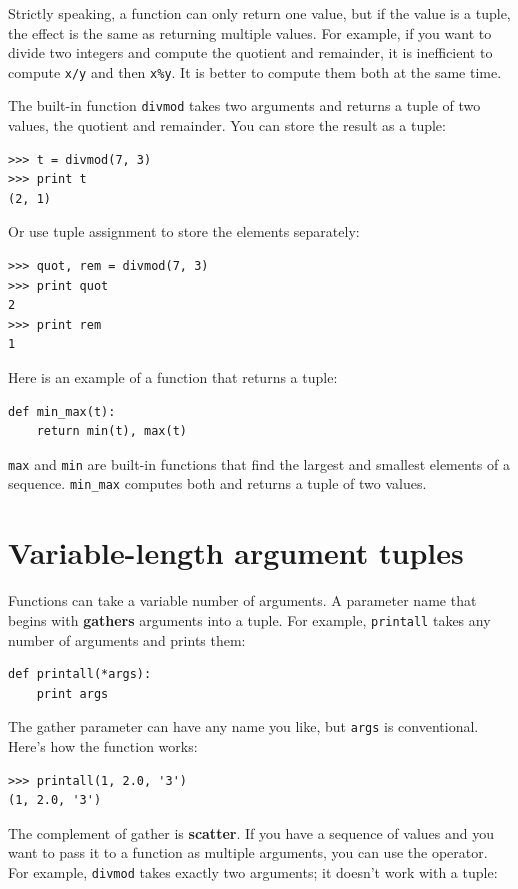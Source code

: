 \documentclass[10pt]{book}
\begin{document}
\begin{CJK}{UTF8}{gbsn}
Strictly speaking, a function can only return one value, but
if the value is a tuple, the effect is the same as returning
multiple values.  For example, if you want to divide two integers
and compute the quotient and remainder, it is inefficient to
compute {\tt x/y} and then {\tt x\%y}.  It is better to compute
them both at the same time.

The built-in function {\tt divmod} takes two arguments and
returns a tuple of two values, the quotient and remainder.
You can store the result as a tuple:

\begin{verbatim}
>>> t = divmod(7, 3)
>>> print t
(2, 1)
\end{verbatim}
%
Or use tuple assignment to store the elements separately:

\begin{verbatim}
>>> quot, rem = divmod(7, 3)
>>> print quot
2
>>> print rem
1
\end{verbatim}
%
Here is an example of a function that returns a tuple:

\begin{verbatim}
def min_max(t):
    return min(t), max(t)
\end{verbatim}
%
{\tt max} and {\tt min} are built-in functions that find
the largest and smallest elements of a sequence.  \verb"min_max"
computes both and returns a tuple of two values.


\section{Variable-length argument tuples}

Functions can take a variable number of arguments.  A parameter
name that begins with {\tt *} {\bf gathers} arguments into
a tuple.  For example, {\tt printall}
takes any number of arguments and prints them:

\begin{verbatim}
def printall(*args):
    print args
\end{verbatim}
%
The gather parameter can have any name you like, but {\tt args} is
conventional.  Here's how the function works:

\begin{verbatim}
>>> printall(1, 2.0, '3')
(1, 2.0, '3')
\end{verbatim}
%
The complement of gather is {\bf scatter}.  If you have a
sequence of values and you want to pass it to a function
as multiple arguments, you can use the {\tt *} operator.
For example, {\tt divmod} takes exactly two arguments; it
doesn't work with a tuple:


\end{CJK}
\end{document}
